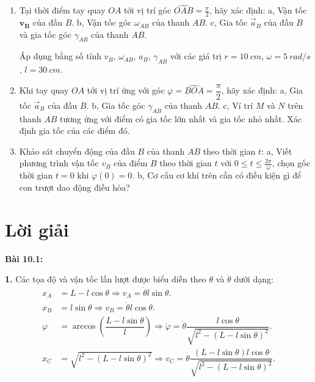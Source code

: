 \begin{enumerate}
	\item Tại thời điểm tay quay \(OA\) tới vị trí góc \(\widehat{OAB}= \frac{\pi}{2}\), hãy xác định:
        \subitem a, Vận tốc \(\mathbf{v_B}\) của đầu \(B\).
        \subitem b, Vận tốc góc \(\omega_{AB}\) của thanh \(AB\).
        \subitem c, Gia tốc \(\vec{a}_B\) của đầu \(B\) và gia tốc góc \(\gamma_{AB}\) của thanh \(AB\).
        
Áp dụng bằng số tính \(v_B\), \(\omega_{AB}\), \(a_B\), \(\gamma_{AB}\) với các giá trị \(r = \SI{10}{cm}\), \(\omega = \SI{5}{rad/s}\), \(l = \SI{30}{cm}\).
    \item Khi tay quay \(OA\) tới vị trí ứng với góc \(\varphi = \widehat{BOA} = \dfrac{\pi}{2}\), hãy xác định: 
        \subitem a, Gia tốc \(\vec{a}_B\) của đầu \(B\).
        \subitem b, Gia tốc góc \(\gamma_{AB}\) của thanh \(AB\).
        \subitem c, Ví trí \(M\) và \(N\) trên thanh \(AB\) tương ứng với điểm có gia tốc lớn nhất và gia tốc nhỏ nhất. Xác định gia tốc của các điểm đó.
    \item Khảo sát chuyển động của đầu \(B\) của thanh $AB$ theo thời gian \(t\):
        \subitem a, Viết phương trình vận tốc \(v_B\) của điểm $B$ theo thời gian \(t\) với \(0 \le t \le \frac{2 \pi}{\omega}\), chọn gốc thời gian \(t = 0\) khi \(\varphi (0) = 0\).
        \subitem b, Cơ cấu cơ khí trên cần có điều kiện gì để con trượt dao động điều hòa?
\end{enumerate}




\section{Lời giải}

\textbf{Bài 10.1:} 

\textbf{1.} Các tọa độ và vận tốc lần lượt được biểu diễn theo $\theta$ và $\dot{\theta}$ dưới dạng:
\begin{align*}
    x_A &= L - l \cos \theta \Rightarrow v_A= \dot{\theta} l \sin \theta. \\
    x_B &= l \sin \theta \Rightarrow v_B = \dot{\theta} l \cos \theta. \\
    \varphi &= \arccos \left( \dfrac{L - l \sin \theta}{l} \right) \Rightarrow \dot{\varphi} = \dot{\theta} \dfrac{l \cos \theta}{\sqrt{l^2 - \left( L - l \sin \theta \right)^2}}. \\
    x_C &= \sqrt{l^2 - \left( L - l \sin \theta \right)^2} \Rightarrow v_C = \dot{\theta} \dfrac{(L-l \sin \theta) l \cos \theta}{\sqrt{l^2 - \left( L - l \sin \theta \right)^2}}.
\end{align*}

